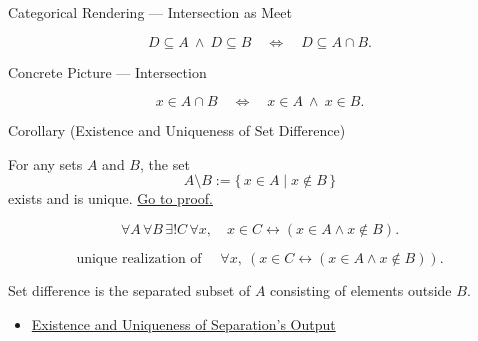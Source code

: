 \begin{lracategoricalcard}{Categorical Rendering --- Intersection as Meet}
\begin{center}

\end{center}
\[
  D\subseteq A\ \wedge\ D\subseteq B
  \quad\Longleftrightarrow\quad
  D\subseteq A\cap B.
\]
\end{lracategoricalcard}

\begin{lracategoricalcard}{Concrete Picture --- Intersection}
\begin{center}

\end{center}
\[
  x\in A\cap B
  \quad\Longleftrightarrow\quad
  x\in A\ \wedge\ x\in B.
\]
\end{lracategoricalcard}

\begin{corollarybox}{Corollary (Existence and Uniqueness of Set Difference)}
\begin{corollary}\label{cor:set-difference-exists-unique}
For any sets $A$ and $B$, the set
\[
  A\setminus B:=\{\,x\in A\mid x\notin B\,\}
\]
exists and is unique.
\hyperref[prf:set-difference-exists-unique]{Go to proof.}
\end{corollary}
\end{corollarybox}



\begin{remark*}
\[
  \forall A\,\forall B\,\exists! C\,\forall x,\quad
  x\in C\leftrightarrow(x\in A\wedge x\notin B).
\]
\end{remark*}

\begin{remark*}
\[
  \text{unique realization of }\quad
  \forall x,\ (x\in C\leftrightarrow(x\in A\wedge x\notin B)).
\]
\end{remark*}

\begin{remark*}[Interpretation]
Set difference is the separated subset of \(A\) consisting of elements outside
\(B\).
\end{remark*}

\begin{dependencies}
\begin{itemize}
  \item \hyperref[thm:separation-output-exists-unique]{Existence and Uniqueness of Separation's Output}
\end{itemize}
\end{dependencies}

